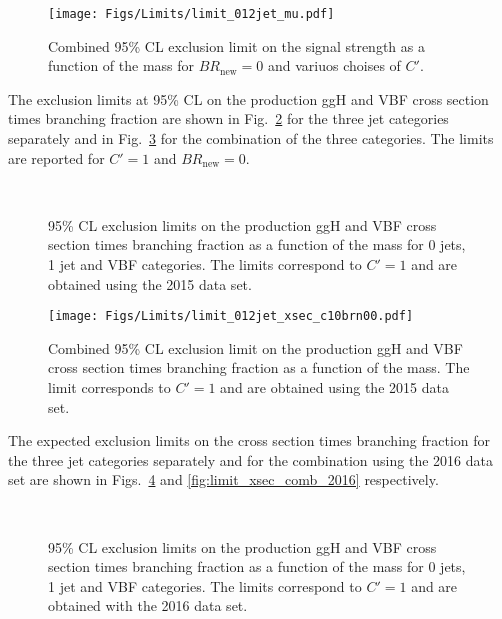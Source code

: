 \begin{figure}[htb]
\centering
\texttt{[image: Figs/Limits/limit\_012jet\_mu.pdf]}
\caption{
    Combined 95\% CL exclusion limit on the signal strength as a function of the mass for $BR_\mathrm{new}=0$ and variuos choises of $C'$.}
    \label{fig:limit_mu_comb}
\end{figure}

The exclusion limits at 95\% CL on the production ggH and VBF cross section times branching fraction are shown in Fig.~\ref{fig:limit_xsec} for the three jet categories separately and in Fig.~\ref{fig:limit_xsec_comb} for the combination of the three categories. The limits are reported for $C'=1$ and $BR_\mathrm{new}=0$.

\begin{figure}[htb]
\centering
{}
\\
\caption{
    95\% CL exclusion limits on the production ggH and VBF cross section times branching fraction as a function of the mass for 0 jets, 1 jet and VBF categories. The limits correspond to $C'=1$ and are obtained using the 2015 data set.}
    \label{fig:limit_xsec}
\end{figure}

\begin{figure}[htb]
\centering
\texttt{[image: Figs/Limits/limit\_012jet\_xsec\_c10brn00.pdf]}
\caption{
    Combined 95\% CL exclusion limit on the production ggH and VBF cross section times branching fraction as a function of the mass. The limit corresponds to $C'=1$ and are obtained using the 2015 data set.}
    \label{fig:limit_xsec_comb}
\end{figure}


The expected exclusion limits on the cross section times branching fraction for the three jet categories separately and for the combination using the 2016 data set are shown in Figs.~\ref{fig:limit_xsec_2016} and \ref{fig:limit_xsec_comb_2016} respectively.


\begin{figure}[htb]
\centering
{}
\\
\caption{
    95\% CL exclusion limits on the production ggH and VBF cross section times branching fraction as a function of the mass for 0 jets, 1 jet and VBF categories. The limits correspond to $C'=1$ and are obtained with the 2016 data set.}
    \label{fig:limit_xsec_2016}
\end{figure}

